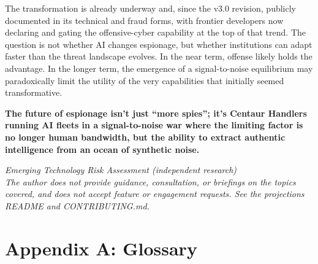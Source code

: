 \documentclass[11pt,letterpaper]{article}
\begin{document}
The transformation is already underway and, since the v3.0 revision, publicly documented in its technical and fraud forms, with frontier developers now declaring and gating the offensive-cyber capability at the top of that trend. The question is not whether AI changes espionage, but whether institutions can adapt faster than the threat landscape evolves. In the near term, offense likely holds the advantage. In the longer term, the emergence of a signal-to-noise equilibrium may paradoxically limit the utility of the very capabilities that initially seemed transformative.

\begin{tcolorbox}[enhanced, colback=steelblue!8, colframe=steelblue, boxrule=1pt, arc=3pt,
  left=10pt, right=10pt, top=10pt, bottom=10pt]
\textbf{The future of espionage isn't just ``more spies''; it's Centaur Handlers running AI fleets in a signal-to-noise war where the limiting factor is no longer human bandwidth, but the ability to extract authentic intelligence from an ocean of synthetic noise.}
\end{tcolorbox}

\vspace{0.5em}
\begin{center}
\textit{Emerging Technology Risk Assessment (independent research)}\\
\textit{The author does not provide guidance, consultation, or briefings on the topics covered, and does not accept feature or engagement requests. See the projections README and CONTRIBUTING.md.}
\end{center}

\vspace{1em}
\section*{Appendix A: Glossary}
\end{document}
